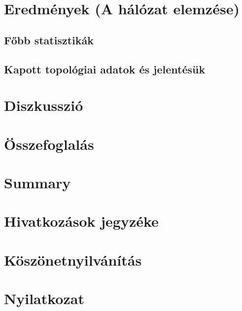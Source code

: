 \documentclass[a4paper,12pt]{article}
\begin{document}
\section{Eredmények (A hálózat elemzése)}
	\subsection{Főbb statisztikák}
	\subsection{Kapott topológiai adatok és jelentésük}
	
\section{Diszkusszió}
\section{Összefoglalás}
\section{Summary}
\section{Hivatkozások jegyzéke}
\section{Köszönetnyilvánítás}
\section{Nyilatkozat}


{}

\end{document}
